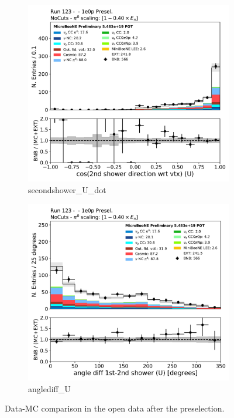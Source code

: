 \begin{figure}[H] 
\begin{center}
    \begin{subfigure}[b]{0.3\textwidth}
    \centering
    \includegraphics[width=1.00\textwidth]{1e0p/dataMCRun123/secondshower_U_dot.pdf}
    \caption{\label{fig:1e0p:dataMCRun1:secondshower_U_dot} secondshower\_U\_dot }
    \end{subfigure}
    \begin{subfigure}[b]{0.3\textwidth}
    \centering
    \includegraphics[width=1.00\textwidth]{1e0p/dataMCRun123/anglediff_U.pdf}
    \caption{\label{fig:1e0p:dataMCRun1:anglediff_U} anglediff\_U }
    \end{subfigure}
\caption{\label{fig:1e0p:dataMCRun1:pi02U}Data-MC comparison in the open data after the \zpsel preselection.}
\end{center}
\end{figure}

